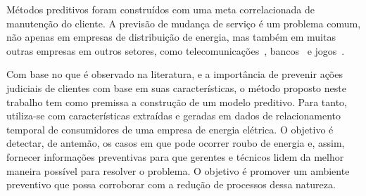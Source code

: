 \documentclass[../main.tex]{subfiles}
\begin{document}
Métodos preditivos foram construídos com uma meta correlacionada de manutenção do cliente. A previsão de mudança de serviço é um problema comum, não apenas em empresas de distribuição de energia, mas também em muitas outras empresas em outros setores, como telecomunicações~, bancos~ e jogos~.


Com base no que é observado na literatura, e a importância de prevenir ações judiciais de clientes com base em suas características, o método proposto neste trabalho tem como premissa a construção de um modelo preditivo. Para tanto, utiliza-se com características extraídas e geradas em dados de relacionamento temporal de consumidores de uma empresa de energia elétrica. O objetivo é detectar, de antemão, os casos em que pode ocorrer roubo de energia e, assim, fornecer informações preventivas para que gerentes e técnicos lidem da melhor maneira possível para resolver o problema. O objetivo é promover um ambiente preventivo que possa corroborar com a redução de processos dessa natureza.
\end{document}
